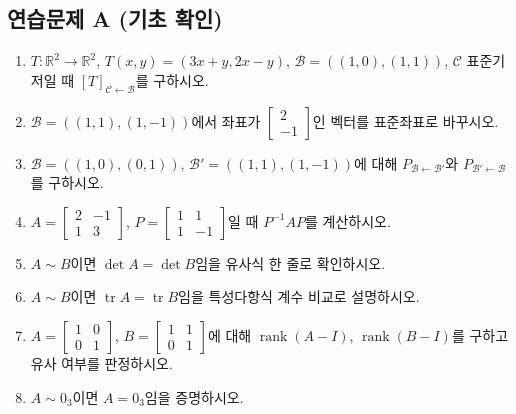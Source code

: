 \subsection*{연습문제 A (기초 확인)}
\begin{enumerate}[label=A\arabic*.]
\item $T:\mathbb R^2\to\mathbb R^2$, $T(x,y)=(3x+y,2x-y)$, $\mathcal B=((1,0),(1,1))$, $\mathcal C$ 표준기저일 때 $[T]_{\mathcal C\leftarrow\mathcal B}$를 구하시오.
\item $\mathcal B=((1,1),(1,-1))$에서 좌표가 $\begin{bmatrix}2\\-1\end{bmatrix}$인 벡터를 표준좌표로 바꾸시오.
\item $\mathcal B=((1,0),(0,1))$, $\mathcal B'=((1,1),(1,-1))$에 대해 $P_{\mathcal B\leftarrow\mathcal B'}$와 $P_{\mathcal B'\leftarrow\mathcal B}$를 구하시오.
\item $A=\begin{bmatrix}2&-1\\1&3\end{bmatrix}$, $P=\begin{bmatrix}1&1\\1&-1\end{bmatrix}$일 때 $P^{-1}AP$를 계산하시오.
\item $A\sim B$이면 $\det A=\det B$임을 유사식 한 줄로 확인하시오.
\item $A\sim B$이면 $\operatorname{tr}A=\operatorname{tr}B$임을 특성다항식 계수 비교로 설명하시오.
\item $A=\begin{bmatrix}1&0\\0&1\end{bmatrix}$, $B=\begin{bmatrix}1&1\\0&1\end{bmatrix}$에 대해 $\operatorname{rank}(A-I)$, $\operatorname{rank}(B-I)$를 구하고 유사 여부를 판정하시오.
\item $A\sim 0_3$이면 $A=0_3$임을 증명하시오.
\end{enumerate}

